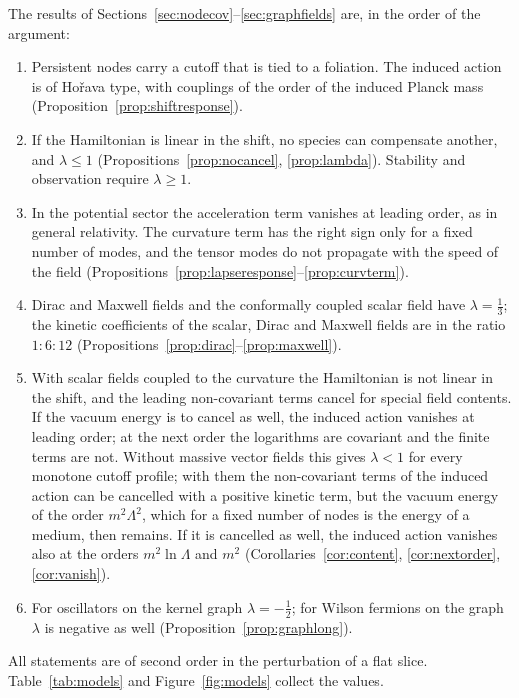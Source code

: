 \documentclass[11pt,a4paper]{article}
\theoremstyle{stmt}
\theoremstyle{defn}
\theoremstyle{rmk}
\numberwithin{equation}{section}
\begin{document}
The results of Sections~\ref{sec:nodecov}--\ref{sec:graphfields} are, in the order of the argument:
\begin{enumerate}
\item Persistent nodes carry a cutoff that is tied to a foliation. The induced action is of Ho\v{r}ava type, with couplings of the order of the induced Planck mass (Proposition~\ref{prop:shiftresponse}).
\item If the Hamiltonian is linear in the shift, no species can compensate another, and $\lambda\le1$ (Propositions~\ref{prop:nocancel}, \ref{prop:lambda}). Stability and observation require $\lambda\ge1$.
\item In the potential sector the acceleration term vanishes at leading order, as in general relativity. The curvature term has the right sign only for a fixed number of modes, and the tensor modes do not propagate with the speed of the field (Propositions~\ref{prop:lapseresponse}--\ref{prop:curvterm}).
\item Dirac and Maxwell fields and the conformally coupled scalar field have $\lambda=\tfrac13$; the kinetic coefficients of the scalar, Dirac and Maxwell fields are in the ratio $1:6:12$ (Propositions~\ref{prop:dirac}--\ref{prop:maxwell}).
\item With scalar fields coupled to the curvature the Hamiltonian is not linear in the shift, and the leading non-covariant terms cancel for special field contents. If the vacuum energy is to cancel as well, the induced action vanishes at leading order; at the next order the logarithms are covariant and the finite terms are not. Without massive vector fields this gives $\lambda<1$ for every monotone cutoff profile; with them the non-covariant terms of the induced action can be cancelled with a positive kinetic term, but the vacuum energy of the order $m^2\Lambda^2$, which for a fixed number of nodes is the energy of a medium, then remains. If it is cancelled as well, the induced action vanishes also at the orders $m^2\ln\Lambda$ and $m^2$ (Corollaries~\ref{cor:content}, \ref{cor:nextorder}, \ref{cor:vanish}).
\item For oscillators on the kernel graph $\lambda=-\tfrac12$; for Wilson fermions on the graph $\lambda$ is negative as well (Proposition~\ref{prop:graphlong}).
\end{enumerate}
All statements are of second order in the perturbation of a flat slice. Table~\ref{tab:models} and Figure~\ref{fig:models} collect the values.
\end{document}
